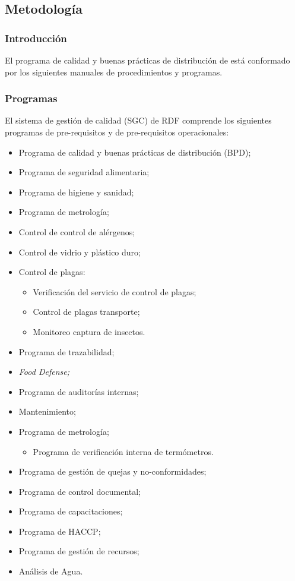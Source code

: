 \subsection{Metodología}

\subsubsection{Introducción}

El programa de calidad y buenas prácticas de distribución de  está conformado por los siguientes manuales de procedimientos y programas.

\subsubsection{Programas}

El sistema de gestión de calidad (SGC) de RDF comprende los siguientes programas de pre-requisitos y de pre-requisitos operacionales:
\begin{itemize}
	\item Programa de calidad y buenas prácticas de distribución (BPD);
	\item Programa de seguridad alimentaria;
	\item Programa de higiene y sanidad;
	\item Programa de metrología;
	\item Control de control de alérgenos;
	\item Control de vidrio y plástico duro;
	\item Control de plagas:
	\begin{itemize}
		\item Verificación del servicio de control de plagas;
		\item Control de plagas transporte;
		\item Monitoreo captura de insectos.
	\end{itemize}
	\item Programa de trazabilidad;
	\item \emph{Food Defense;}
	\item Programa de auditorías internas;
	\item Mantenimiento;
	\item Programa de metrología;
	\begin{itemize}
		\item Programa de verificación interna de termómetros.
	\end{itemize}
	\item Programa de gestión de quejas y no-conformidades;
	\item Programa de control documental;
	\item Programa de capacitaciones;
	\item Programa de \gls{HACCP};
	\item Programa de gestión de recursos;
	\item Análisis de Agua.
\end{itemize}

